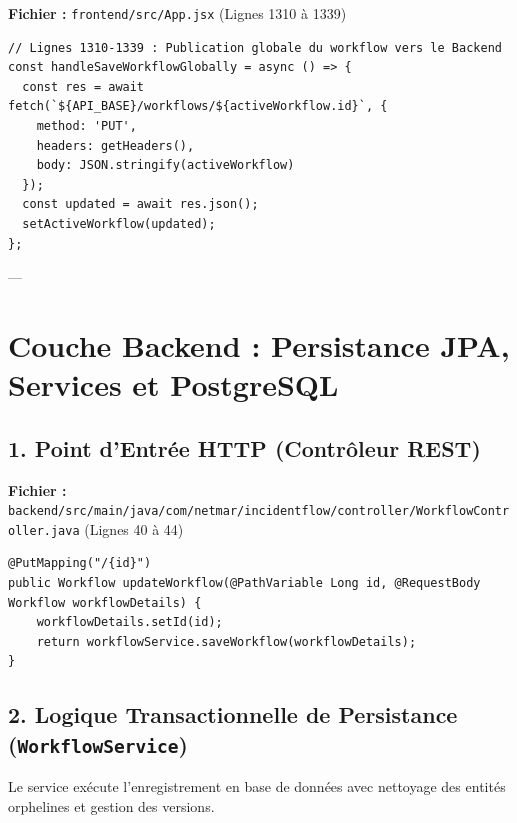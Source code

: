 \documentclass[11pt,a4paper]{article}
\begin{document}
\begin{codebox}[title=Localisation dans le Code :]
\textbf{Fichier :} \small\texttt{frontend/src/App.jsx} (Lignes 1310 à 1339)
\end{codebox}

\begin{lstlisting}[language=CustomJava, caption={Envoi HTTP PUT vers l'API Backend dans App.jsx}]
// Lignes 1310-1339 : Publication globale du workflow vers le Backend
const handleSaveWorkflowGlobally = async () => {
  const res = await fetch(`${API_BASE}/workflows/${activeWorkflow.id}`, {
    method: 'PUT',
    headers: getHeaders(),
    body: JSON.stringify(activeWorkflow)
  });
  const updated = await res.json();
  setActiveWorkflow(updated);
};
\end{lstlisting}

---

\section{Couche Backend : Persistance JPA, Services et PostgreSQL}

\subsection{1. Point d'Entrée HTTP (Contrôleur REST)}

\begin{codebox}[title=Localisation dans le Code :]
\textbf{Fichier :} \small\texttt{backend/src/main/java/com/netmar/incidentflow/controller/WorkflowController.java} (Lignes 40 à 44)
\end{codebox}

\begin{lstlisting}[language=CustomJava, caption={Endpoint PUT d'enregistrement dans WorkflowController.java}]
@PutMapping("/{id}")
public Workflow updateWorkflow(@PathVariable Long id, @RequestBody Workflow workflowDetails) {
    workflowDetails.setId(id);
    return workflowService.saveWorkflow(workflowDetails);
}
\end{lstlisting}

\subsection{2. Logique Transactionnelle de Persistance (\texttt{WorkflowService})}
Le service exécute l'enregistrement en base de données avec nettoyage des entités orphelines et gestion des versions.
\end{document}
